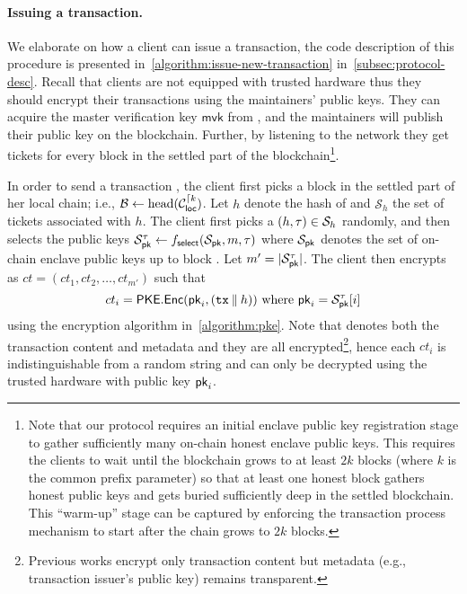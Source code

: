 \paragraph{Issuing a transaction.}
%
We elaborate on how a client can issue a transaction, the code description of this procedure is presented in~\cref{algorithm:issue-new-transaction} in~\cref{subsec:protocol-desc}.
%
Recall that clients are not equipped with trusted hardware thus they should encrypt their transactions using the maintainers' public keys.
%
They can acquire the master verification key $\mathsf{mvk}$ from \funcEnclave, and the maintainers will publish their public key on the blockchain.
%
Further, by listening to the network they get tickets for every block in the settled part of the blockchain\footnote{Note that our protocol requires an initial enclave public key registration stage to gather sufficiently many on-chain honest enclave public keys. This requires the clients to wait until the blockchain grows to at least $2k$ blocks (where $k$ is the common prefix parameter) so that at least one honest block gathers honest public keys and gets buried sufficiently deep in the settled blockchain. This ``warm-up'' stage can be captured by enforcing the transaction process mechanism to start after the chain grows to $2k$ blocks.}.

In order to send a transaction \tx, the client first picks a block \block in the settled part of her local chain; i.e., $\mathcal{B} \gets \mathrm{head}(\mathcal{C}_{\mathsf{loc}}^{\lceil{\ensuremath{k}}})$.
%
Let $h$ denote the hash of \block and $\mathcal{S}_h$ the set of tickets associated with $h$.
%
The client first picks a $(h, \mathsf{\tau}) \in \mathcal{S}_h$ randomly, and then selects the public keys $\mathcal{S}^\mathsf{\tau}_{\mathsf{pk}} \gets f_{\mathsf{select}}(\mathcal{S}_{\mathsf{pk}}, m, \mathsf{\tau})$ where $\mathcal{S}_{\mathsf{pk}}$ denotes the set of on-chain enclave public keys up to block \block.
%
Let $m' = |\mathcal{S}^\mathsf{\tau}_{\mathsf{pk}}|$.
%
The client then encrypts \tx as $ct = (ct_1, ct_2, \ldots, ct_{m'})$ such that
%
\[ ct_i = \mathsf{PKE}.\mathsf{Enc}(\mathsf{pk}_i, (\mathtt{tx} \mathbin\Vert h)) ~\mathrm{where}~ \mathsf{pk}_i = \mathcal{S}^\mathsf{\tau}_{\mathsf{pk}}[i] \]
%
using the encryption algorithm in~\cref{algorithm:pke}.
%
Note that \tx denotes both the transaction content and metadata and they are all encrypted\footnote{Previous works encrypt only transaction content but metadata (e.g., transaction issuer's public key) remains transparent.}, hence each $ct_i$ is indistinguishable from a random string and can only be decrypted using the trusted hardware with public key $\mathsf{pk}_i$.

